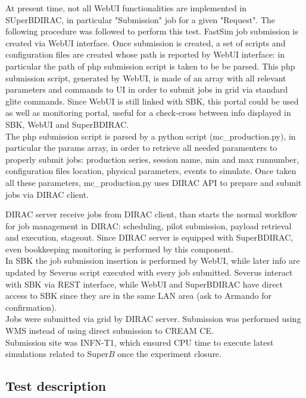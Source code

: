 \documentclass[a4paper]{jpconf}
\begin{document}
At present time, not all WebUI functionalities are implemented in SUperBDIRAC, in particular "Submission" job for a given "Request".
The following procedure was followed to perform this test. FastSim job submission is created via WebUI interface. Once submission is created, a set of scripts and configuration files are created whose path is reported by WebUI interface: in particular the path of php submission script is taken to be be parsed. This php submission script, generated by WebUI, is made of an array with all relevant parameters and commands to UI in order to submit jobs in grid via standard glite commands.
Since WebUI is still linked with SBK, this portal could be used as well as monitoring portal, useful for a check-cross between info displayed in SBK, WebUI and SuperBDIRAC.\\

The php submission script is parsed by a python script (mc\_production.py), in particular the params array, in order to retrieve all needed paramenters to properly submit jobs: production series, session name, min and max runnumber, configuration files location, physical parameters, events to simulate. Once taken all these parameters, mc\_production.py uses DIRAC API to prepare and submit jobs via DIRAC client.

DIRAC server receive jobs from DIRAC client, than starts the normal workflow for job management in DIRAC: scheduling, pilot submission, payload retrieval and execution, stageout. Since DIRAC server is equipped with SuperBDIRAC, even bookkeeping monitoring is performed by this component.\\

In SBK the job submission insertion is performed by WebUI, while later info are updated by Severus script executed with every job submitted. Severus interact with SBK via REST interface, while WebUI and SuperBDIRAC have direct access to SBK since they are in the same LAN area (ask to Armando for confirmation).\\

Jobs were submitted via grid by DIRAC server. Submission was performed using WMS instead of using direct submission to CREAM CE.\\

Submission site was INFN-T1, which ensured CPU time to execute latest simulations related to Super$B$ once the experiment closure.

\subsection{Test description}
\end{document}
